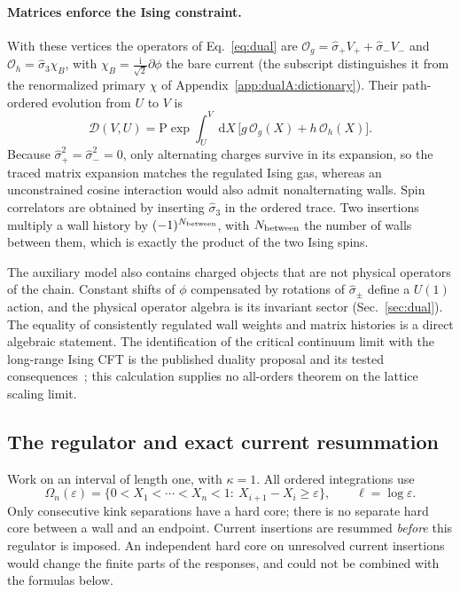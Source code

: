 \documentclass[11pt,a4paper]{article}
\numberwithin{equation}{section}
\newcommand{\dd}{\,\mathrm d}
\newcommand{\Og}{\mathcal O_g}
\newcommand{\Oh}{\mathcal O_h}
\begin{document}
\paragraph{Matrices enforce the Ising constraint.} With these vertices the operators of Eq.~\eqref{eq:dual} are
$\Og=\hat\sigma_+V_++\hat\sigma_-V_-$ and $\Oh=\hat\sigma_3\chi_B$, with $\chi_B=\frac{\mathrm i}{\sqrt2}\partial\phi$
the bare current (the subscript distinguishes it from the renormalized primary $\chi$ of
Appendix~\ref{app:dualA:dictionary}). Their path-ordered evolution from $U$ to $V$ is
\begin{equation}
 \mathcal D(V,U)=\mathrm P\exp\int_U^V\dd X\,\bigl[g\,\Og(X)+h\,\Oh(X)\bigr].
\end{equation}
Because $\hat\sigma_+^2=\hat\sigma_-^2=0$, only alternating charges survive in its expansion, so the traced matrix
expansion matches the regulated Ising gas, whereas an unconstrained cosine interaction would also admit nonalternating
walls. Spin correlators are obtained by inserting $\hat\sigma_3$ in the ordered trace. Two insertions multiply a wall
history by $(-1)^{N_{\rm between}}$, with $N_{\rm between}$ the number of walls between them, which is exactly the
product of the two Ising spins.

The auxiliary model also contains charged objects that are not physical operators of the chain. Constant shifts of
$\phi$ compensated by rotations of $\hat\sigma_\pm$ define a $U(1)$ action, and the physical operator algebra is its
invariant sector (Sec.~\ref{sec:dual}). The equality of consistently regulated wall weights and matrix histories is a
direct algebraic statement. The identification of the critical continuum limit with the long-range Ising CFT is the
published duality proposal and its tested consequences~\cite{Benedetti:2025nzp}; this calculation supplies no
all-orders theorem on the lattice scaling limit.

\subsection{The regulator and exact current resummation}\label{app:dualA:regulator}
Work on an interval of length one, with $\kappa=1$. All ordered integrations use
\begin{equation}
 \Omega_n(\varepsilon)=\{0<X_1<\cdots<X_n<1:\ X_{i+1}-X_i\ge\varepsilon\},\qquad \ell=\log\varepsilon.
 \label{eq:dualA:domain}
\end{equation}
Only consecutive kink separations have a hard core; there is no separate hard core between a wall and an endpoint.
Current insertions are resummed \emph{before} this regulator is imposed. An independent hard core on unresolved
current insertions would change the finite parts of the responses, and could not be combined with the formulas below.
\end{document}
